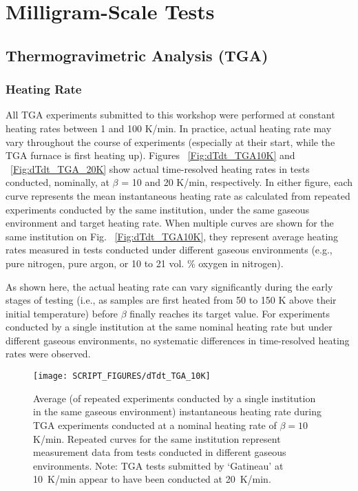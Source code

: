 \documentclass{book}
\begin{document}
\section{Milligram-Scale Tests}

\subsection{Thermogravimetric Analysis (TGA)}

\subsubsection{Heating Rate}

All TGA experiments submitted to this workshop were performed at constant heating rates between 1 and 100 K/min. In practice, actual heating rate may vary throughout the course of experiments (especially at their start, while the TGA furnace is first heating up). Figures ~\ref{Fig:dTdt_TGA10K} and ~\ref{Fig:dTdt_TGA_20K} show actual time-resolved heating rates in tests conducted, nominally, at $\beta$ = 10 and 20 K/min, respectively. In either figure, each curve represents the mean instantaneous heating rate as calculated from repeated experiments conducted by the same institution, under the same gaseous environment and target heating rate. When multiple curves are shown for the same institution on Fig. ~\ref{Fig:dTdt_TGA10K}, they represent average heating rates measured in tests conducted under different gaseous environments (e.g., pure nitrogen, pure argon, or 10 to 21 vol. \% oxygen in nitrogen).

As shown here, the actual heating rate can vary significantly during the early stages of testing (i.e., as samples are first heated from 50 to 150 K above their initial temperature) before $\beta$ finally reaches its target value. For experiments conducted by a single institution at the same nominal heating rate but under different gaseous environments, no systematic differences in time-resolved heating rates were observed.

\begin{figure}
  \centering
  \texttt{[image: SCRIPT\_FIGURES/dTdt\_TGA\_10K]}
  \caption{Average (of repeated experiments conducted by a single institution in the same gaseous environment) instantaneous heating rate during TGA experiments conducted at a nominal heating rate of $\beta=10$ K/min. Repeated curves for the same institution represent measurement data from tests conducted in different gaseous environments. Note: TGA tests submitted by ‘Gatineau’ at 10~K/min appear to have been conducted at 20~K/min.}
  \label{Fig:dTdt_TGA_10K}
\end{figure}
\end{document}
